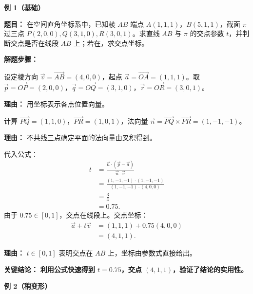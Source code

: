 \begin{examplebox}
	\textbf{\textcolor{CExample}{例 1（基础）}}

	\medskip
	\textbf{\textcolor{CExample}{题目：}}
	在空间直角坐标系中，已知棱 $AB$ 端点 $A(1,1,1)$，$B(5,1,1)$，截面 $\pi$ 过三点 $P(2,0,0),Q(3,1,0),R(3,0,1)$。求直线 $AB$ 与 $\pi$ 的交点参数 $t$，并判断交点是否在线段 $AB$ 上；若在，求交点坐标。

	\medskip
	\textbf{\textcolor{CExample}{解题步骤：}}
	\begin{description}[style=nextline, leftmargin=2.8em, labelsep=0.5em, itemsep=0.45em]
		\item[\textbf{第一步（参数与向量设定）：}]
			设定棱方向 $\vec{v}=\overrightarrow{AB}=(4,0,0)$，起点 $\vec{a}=\overrightarrow{OA}=(1,1,1)$。取 $\vec{p}=\overrightarrow{OP}=(2,0,0)$，$\vec{q}=\overrightarrow{OQ}=(3,1,0)$，$\vec{r}=\overrightarrow{OR}=(3,0,1)$。
			\par\textbf{理由：} 用坐标表示各点位置向量。
		\item[\textbf{第二步（法向量计算）：}]
			计算 $\overrightarrow{PQ}=(1,1,0)$，$\overrightarrow{PR}=(1,0,1)$，法向量 $\vec{n}=\overrightarrow{PQ}\times\overrightarrow{PR}=(1,-1,-1)$。
			\par\textbf{理由：} 不共线三点确定平面的法向量由叉积得到。
		\item[\textbf{第三步（公式代入与判断）：}]
			代入公式：
			\[
				\begin{aligned}
					t &= \frac{\vec{n}\cdot(\vec{p}-\vec{a})}{\vec{n}\cdot\vec{v}} \\ &= \frac{(1,-1,-1)\cdot(1,-1,-1)}{(1,-1,-1)\cdot(4,0,0)} \\ &= \frac{3}{4} \\ &= 0.75.
			\end{aligned}
			\]
			由于 $0.75 \in [0,1]$，交点在线段上。交点坐标：
			\[
				\begin{aligned}
					\vec{a}+t\vec{v} &= (1,1,1) + 0.75(4,0,0) \\ &= (4,1,1).
			\end{aligned}
			\]
			\par\textbf{理由：} $t\in[0,1]$ 表明交点在 $AB$ 上，坐标由参数式直接给出。
	\end{description}

	\medskip
	\textbf{\textcolor{CExample}{关键结论：}}
	\textbf{利用公式快速得到 $t=0.75$，交点 $(4,1,1)$，验证了结论的实用性。}

	\medskip
	\textbf{\textcolor{CExample}{例 2（稍变形）}}


\end{examplebox}
